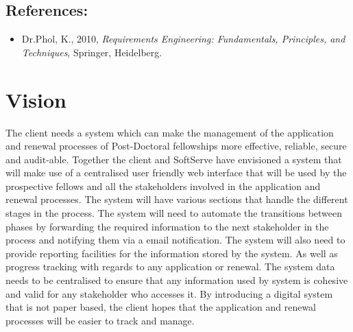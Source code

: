 \documentclass[12pt]{article}
\begin{document}
\subsection{References:}
\vspace{0.1in}
\begin{itemize}
\item Dr.Phol, K., 2010, \textit{Requirements Engineering: Fundamentals, Principles, and Techniques}, Springer, Heidelberg.
\end{itemize}	

\vspace{0.5in}

\section{Vision} %
\vspace{0.2in}
The client needs a system which can make the management of the application and renewal processes of Post-Doctoral fellowships more effective, reliable, secure and audit-able. Together the client and SoftServe have envisioned a system that will make use of a centralised user friendly web interface that will be used by the prospective fellows and all the stakeholders involved in the application and renewal processes. The system will have various sections that handle the different stages in the process. The system will need to automate the transitions between phases by forwarding the required information to the next stakeholder in the process and notifying them via a email notification. The system will also need to provide reporting facilities for the information stored by the system. As well as progress tracking with regards to any application or renewal. The system data needs to be centralised to ensure that any information used by system is cohesive and valid for any stakeholder who accesses it. By introducing a digital system that is not paper based, the client hopes that the application and renewal processes will be easier to track and manage.
\vspace{0.5in}
\end{document}
